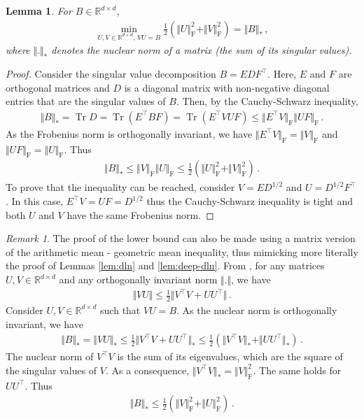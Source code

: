 \documentclass[11pt,reqno]{article}
\DeclareMathOperator{\Tr}{Tr}
\DeclareMathOperator{\Fro}{F}
\newcommand{\R}{\mathbb{R}}
\renewcommand{\leq}{\leqslant}
\numberwithin{equation}{section}
\theoremstyle{plain}
\newtheorem{lem}[assumption]{Lemma}
\theoremstyle{definition}
\theoremstyle{remark}
\newtheorem{remark}[assumption]{Remark}
\begin{document}
\begin{lem}
	\label{lem:linear}
	For $B \in \R^{d \times d}$,
	\begin{align*}
		\min_{U,V \in \R^{d \times d}, \, VU = B} \frac{1}{2} \left(\Vert U \Vert_{\Fro}^2 + \Vert V \Vert_{\Fro}^2\right) = \Vert B \Vert_{*} \, ,
	\end{align*}
	where $\Vert . \Vert_{*}$ denotes the nuclear norm of a matrix (the sum of its singular values).
\end{lem}

\begin{proof}
	Consider the singular value decomposition $B = EDF^\top$. Here, $E$ and $F$ are orthogonal matrices and $D$ is a diagonal matrix with non-negative diagonal entries that are the singular values of $B$. Then, by the Cauchy-Schwarz inequality,
	\begin{align*}
		\Vert B \Vert_{*} = \Tr D = \Tr(E^\top B F) =\Tr(E^\top VU F) \leq \Vert E^\top V \Vert_{\Fro} \Vert U F \Vert_{\Fro} \, .
	\end{align*}
	As the Frobenius norm is orthogonally invariant, we have $\Vert E^\top V \Vert_{\Fro} = \Vert V \Vert_{\Fro}$ and $\Vert U F \Vert_{\Fro} = \Vert U \Vert_{\Fro}$. Thus 
	\begin{align*}
		\Vert B \Vert_{*} \leq \Vert V \Vert_{\Fro} \Vert U \Vert_{\Fro} \leq \frac{1}{2} \left(\Vert U \Vert_{\Fro}^2 + \Vert V \Vert_{\Fro}^2\right) \, . 
	\end{align*}
	To prove that the inequality can be reached, consider $V = ED^{1/2}$ and $U = D^{1/2}F^\top$. In this case, $E^\top V = UF = D^{1/2}$ thus the Cauchy-Schwarz inequality is tight and both $U$ and $V$ have the same Frobenius norm. 
\end{proof}

\begin{remark}
	\label{rmk:bhatia}
The proof of the lower bound can also be made using a matrix version of the arithmetic mean - geometric mean inequality, thus mimicking more literally the proof of Lemmas \ref{lem:dln} and \ref{lem:deep-dln}. From \cite[Corollary IX.4.4]{bhatia2013matrix}, for any matrices $U,V \in \R^{d \times d}$ and any orthogonally invariant norm $\Vert . \Vert$, we have 
	\begin{align*}
		\Vert VU \Vert \leq \frac{1}{2} \Vert V^\top V + U U^\top \Vert \, .
	\end{align*}
	Consider $U,V \in \R^{d \times d}$ such that $VU = B$. As the nuclear norm is orthogonally invariant, we have
	\begin{align*}
		\Vert B \Vert_{*} = \Vert VU \Vert_{*} \leq \frac{1}{2} \Vert V^\top V + U U^\top \Vert_{*} \leq \frac{1}{2} \left(\Vert V^\top V \Vert_* + \Vert UU^\top  \Vert_*\right) \, .
	\end{align*}
	The nuclear norm of $V^\top V$ is the sum of its eigenvalues, which are the square of the singular values of $V$. As a consequence, $\Vert V^\top V \Vert_* = \Vert V \Vert_{\Fro}^2$. The same holds for $U U^\top$. Thus
	\begin{align*}
		\Vert B \Vert_{*} \leq \frac{1}{2} \left(\Vert V \Vert_{\Fro}^2 + \Vert U \Vert_{\Fro}^2\right) \, .
	\end{align*}
\end{remark}
\end{document}
